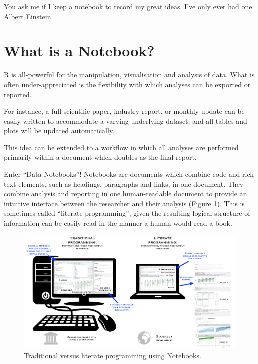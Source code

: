 \documentclass[
  12pt,
  krantz2]{krantz}
\renewenvironment{quote}{\begin{VF}}{\end{VF}}
\begin{document}

\begin{quote}
You ask me if I keep a notebook to record my great ideas. I've only ever had one.\\
Albert Einstein
\end{quote}

\hypertarget{what-is-a-notebook}{%
\section{What is a Notebook?}\label{what-is-a-notebook}}

R is all-powerful for the manipulation, visualisation and analysis of data.
What is often under-appreciated is the flexibility with which analyses can be exported or reported.

For instance, a full scientific paper, industry report, or monthly update can be easily written to accommodate a varying underlying dataset, and all tables and plots will be updated automatically.

This idea can be extended to a workflow in which all analyses are performed primarily within a document which doubles as the final report.

Enter ``Data Notebooks''!
Notebooks are documents which combine code and rich text elements, such as headings, paragraphs and links, in one document.
They combine analysis and reporting in one human-readable document to provide an intuitive interface between the researcher and their analysis (Figure \ref{fig:chap12-fig-literate}).
This is sometimes called ``literate programming'', given the resulting logical structure of information can be easily read in the manner a human would read a book.

\begin{figure}
\centering
\includegraphics{images/chapter12/1_literate_programming.pdf}
\caption{\label{fig:chap12-fig-literate}Traditional versus literate programming using Notebooks.}
\end{figure}
\end{document}
